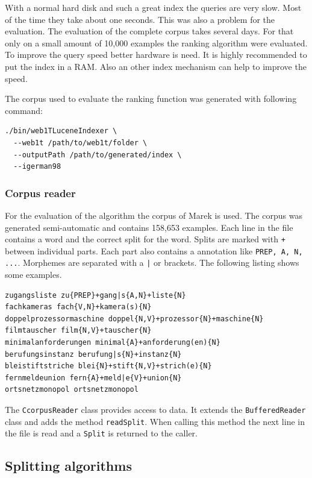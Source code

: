 \documentclass[11pt, accentcolor=tud9b, nochapname]{tudreport}
\begin{document}
With a normal hard disk and such a great index the queries are very slow. Most of the time they take about one seconds. This was also a problem for the evaluation. The evaluation of the complete corpus takes several days. For that only on a small amount of 10,000 examples the ranking algorithm were evaluated. To improve the query speed better hardware is need. It is highly recommended to put the index in a RAM. Also an other index mechanism can help to improve the speed.

The corpus used to evaluate the ranking function was generated with following command:

\begin{lstlisting}
./bin/web1TLuceneIndexer \
  --web1t /path/to/web1t/folder \
  --outputPath /path/to/generated/index \
  --igerman98
\end{lstlisting}

\subsubsection{Corpus reader}

For the evaluation of the algorithm the corpus of Marek \cite{marek} is used. The corpus was generated semi-automatic and contains 158,653 examples. Each line in the file contains a word and the correct split for the word. Splits are marked with \texttt{+} between individual parts. Each part also contains a annotation like \texttt{PREP, A, N, ...}. Morphemes are separated with a \texttt{|} or brackets. The following listing shows some examples.

\begin{lstlisting}
zugangsliste zu{PREP}+gang|s{A,N}+liste{N}
fachkameras fach{V,N}+kamera(s){N}
doppelprozessormaschine doppel{N,V}+prozessor{N}+maschine{N}
filmtauscher film{N,V}+tauscher{N}
minimalanforderungen minimal{A}+anforderung(en){N}
berufungsinstanz berufung|s{N}+instanz{N}
bleistiftstriche blei{N}+stift{N,V}+strich(e){N}
fernmeldeunion fern{A}+meld|e{V}+union{N}
ortsnetzmonopol ortsnetzmonopol
\end{lstlisting}

The \texttt{CcorpusReader} class provides access to data. It extends the \texttt{BufferedReader} class and adds the method \texttt{readSplit}. When calling this method the next line in the file is read and a \texttt{Split} is returned to the caller.

\subsection{Splitting algorithms}
\end{document}
